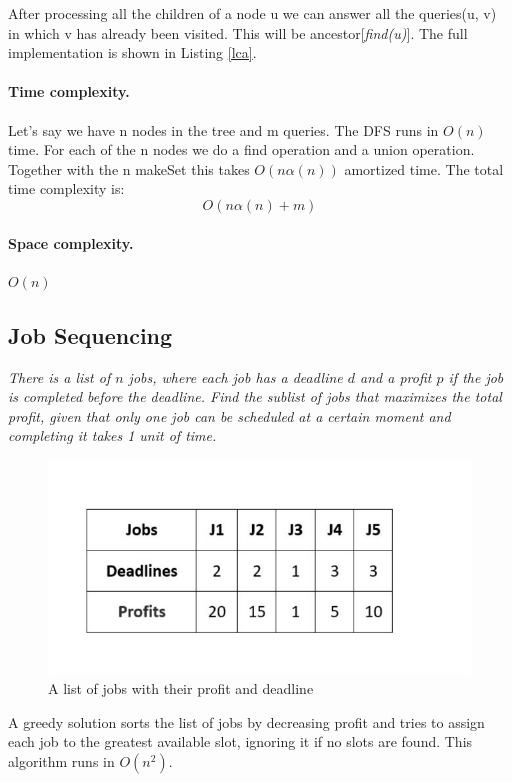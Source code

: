 \documentclass{article}
\begin{document}
After processing all the children of a node u we can answer all the
queries(u, v) in which v has already been visited. This will be ancestor[\emph{find(u)}]. The full implementation
is shown in Listing \ref{lca}.

\paragraph{Time complexity.} Let's say we have n nodes in the tree and m queries.
The DFS runs in $O(n)$ time. For each of the n nodes we do a find operation and a union operation. Together
with the n makeSet this takes $O(n\alpha(n))$ amortized time.
The total time complexity is: 
$$O(n\alpha(n) + m)$$

\paragraph{Space complexity.} $O(n)$


\subsection{Job Sequencing}
\emph{There is a list of $n$ jobs, where each job has a deadline $d$ and a profit $p$ if the job
is completed before the deadline. Find the sublist of jobs that maximizes the total profit, given
that only one job can be scheduled at a certain moment and completing it takes 1 unit of time.}
\begin{figure}[h!]
    \centering
    \includegraphics[scale=0.5]{img/jobs.jpeg}
    \caption{A list of jobs with their profit and deadline}
\end{figure}
\bigskip
A greedy solution \cite{key} sorts the list of jobs by decreasing profit and tries to assign each job to the greatest available slot, ignoring it if no slots
are found. This algorithm runs in $O(n^2)$.
\end{document}
